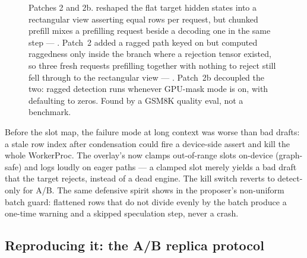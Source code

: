 \begin{figure}[htbp]
{%
}
\caption{Patches 2 and 2b.  reshaped the flat target
hidden states into a rectangular  view asserting equal
rows per request, but chunked prefill mixes a prefilling request beside a
decoding one in the same step --- .
Patch~2 added a ragged path keyed on  but computed
raggedness only inside the branch where a rejection tensor existed, so three
fresh requests prefilling together with nothing to reject still fell through
to the rectangular view --- . Patch~2b
decoupled the two: ragged detection runs whenever GPU-mask mode is on, with
 defaulting to zeros. Found by a GSM8K quality eval, not a
benchmark.}
\label{fig:specdecode-ragged-views}
\end{figure}

\begin{hbwarstory}
Before the slot map, the failure mode at long context was worse than bad
drafts: a stale row index after condensation could fire a device-side
 assert and kill the whole WorkerProc. The
overlay's  now clamps out-of-range slots on-device
(graph-safe) and logs loudly on eager paths --- a clamped slot merely yields
a bad draft that the target rejects, instead of a dead engine. The kill
switch  reverts to detect-only for A/B. The same
defensive spirit shows in the proposer's non-uniform batch guard: flattened
rows that do not divide evenly by the batch produce a one-time warning and a
skipped speculation step, never a crash.
\end{hbwarstory}

\subsection{Reproducing it: the A/B replica protocol}

